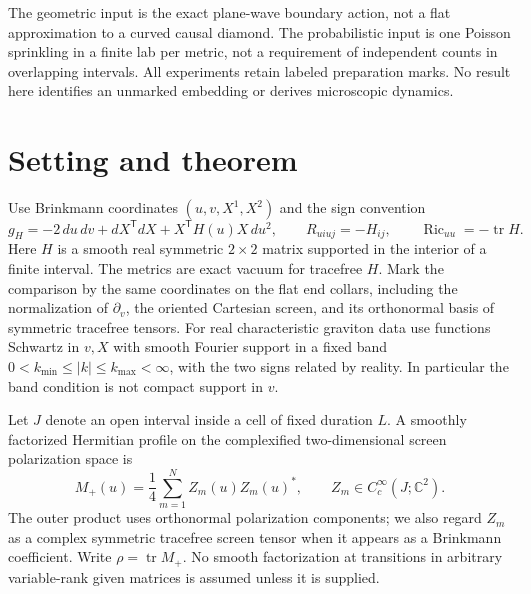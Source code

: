 \documentclass[11pt]{article}
\newcommand{\Ric}{\operatorname{Ric}}
\newcommand{\tr}{\operatorname{tr}}
\begin{document}
The geometric input is the exact plane-wave boundary action, not a
flat approximation to a curved causal diamond. The probabilistic
input is one Poisson sprinkling in a finite lab per metric, not a
requirement of independent counts in overlapping intervals. All
experiments retain labeled preparation marks. No result here
identifies an unmarked embedding or derives microscopic dynamics.


\section{Setting and theorem}\label{sec:oldsetting}
Use Brinkmann coordinates \((u,v,X^1,X^2)\) and the sign convention
\begin{equation}\label{eq:brink}
g_H=-2\,du\,dv+dX^\mathsf{T}dX+X^\mathsf{T}H(u)X\,du^2,
\qquad R_{uiuj}=-H_{ij},\qquad \Ric_{uu}=-\tr H .
\end{equation}
Here \(H\) is a smooth real symmetric \(2\times2\) matrix supported in the interior of a finite interval. The metrics are exact vacuum for tracefree \(H\). Mark the comparison by the same coordinates on the flat end collars, including the normalization of \(\partial_v\), the oriented Cartesian screen, and its orthonormal basis of symmetric tracefree tensors. For real characteristic graviton data use functions Schwartz in \(v,X\) with smooth Fourier support in a fixed band \(0<k_{\min}\le |k|\le k_{\max}<\infty\), with the two signs related by reality. In particular the band condition is not compact support in \(v\).

Let \(J\) denote an open interval inside a cell of fixed duration \(L\). A smoothly factorized Hermitian profile on the complexified two-dimensional screen polarization space is
\begin{equation}\label{eq:given}
M_+(u)=\frac14\sum_{m=1}^N Z_m(u)Z_m(u)^*,
\qquad Z_m\in C^\infty_c(J;\mathbb C^2).
\end{equation}
The outer product uses orthonormal polarization components; we also regard \(Z_m\) as a complex symmetric tracefree screen tensor when it appears as a Brinkmann coefficient. Write \(\rho=\tr M_+\). No smooth factorization at transitions in arbitrary variable-rank given matrices is assumed unless it is supplied.
\end{document}

